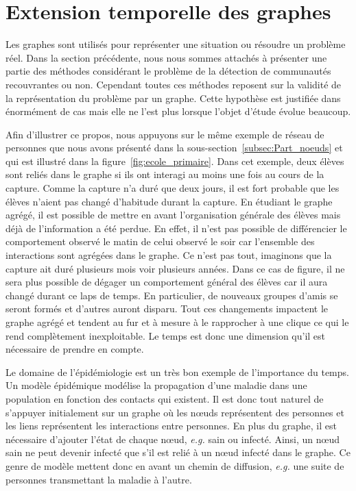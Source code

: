 \section{Extension temporelle des graphes}
\label{sec:intro_extension_temporelle}

Les graphes sont utilisés pour représenter une situation ou résoudre un problème réel.
Dans la section précédente, nous nous sommes attachés à présenter une partie des méthodes considérant le problème de la détection de communautés recouvrantes ou non.
Cependant toutes ces méthodes reposent sur la validité de la représentation du problème par un graphe.
Cette hypothèse est justifiée dans énormément de cas mais elle ne l'est plus lorsque l'objet d'étude évolue beaucoup.

Afin d'illustrer ce propos, nous appuyons sur le même exemple de réseau de personnes que nous avons présenté dans la sous-section~\ref{subsec:Part_noeuds} et qui est illustré dans la figure~\ref{fig:ecole_primaire}.
Dans cet exemple, deux élèves sont reliés dans le graphe si ils ont interagi au moins une fois au cours de la capture.
Comme la capture n'a duré que deux jours, il est fort probable que les élèves n'aient pas changé d'habitude durant la capture.
En étudiant le graphe agrégé, il est possible de mettre en avant l'organisation générale des élèves mais déjà de l'information a été perdue.
En effet, il n'est pas possible de différencier le comportement observé le matin de celui observé le soir car l'ensemble des interactions sont agrégées dans le graphe.
Ce n'est pas tout, imaginons que la capture ait duré plusieurs mois voir plusieurs années.
Dans ce cas de figure, il ne sera plus possible de dégager un comportement général des élèves car il aura changé durant ce laps de temps.
En particulier, de nouveaux groupes d'amis se seront formés et d'autres auront disparu.
Tout ces changements impactent le graphe agrégé et tendent au fur et à mesure à le rapprocher à une clique ce qui le rend complètement inexploitable.
Le temps est donc une dimension qu'il est nécessaire de prendre en compte.

Le domaine de l'épidémiologie est un très bon exemple de l'importance du temps.
Un modèle épidémique modélise la propagation d'une maladie dans une population en fonction des contacts qui existent.
Il est donc tout naturel de s'appuyer initialement sur un graphe où les n\oe uds représentent des personnes et les liens représentent les interactions entre personnes.
En plus du graphe, il est nécessaire d'ajouter l'état de chaque n\oe ud, \emph{e.g.} sain ou infecté.
Ainsi, un n\oe ud sain ne peut devenir infecté que s'il est relié à un n\oe ud infecté dans le graphe.
Ce genre de modèle mettent donc en avant un chemin de diffusion, \emph{e.g.} une suite de personnes transmettant la maladie à l'autre.

